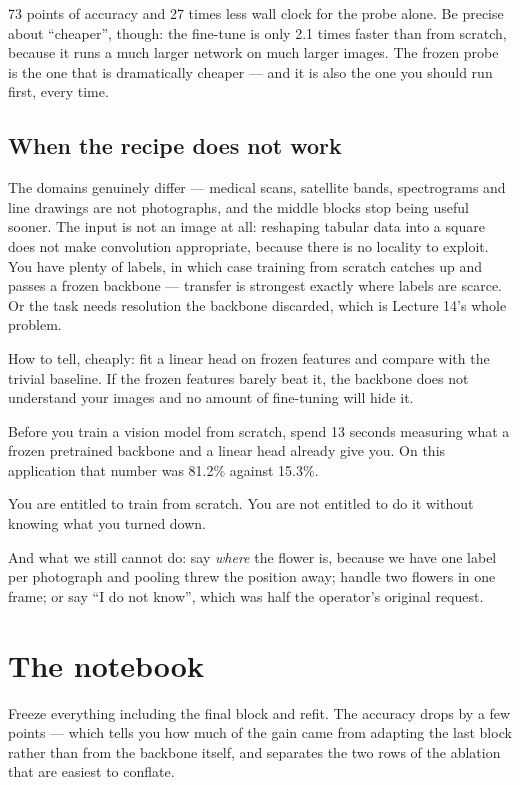 \documentclass[11pt,a4paper]{article}
\begin{document}
73 points of accuracy and 27 times less wall clock for the probe alone. Be
precise about ``cheaper'', though: the fine-tune is only 2.1 times faster than
from scratch, because it runs a much larger network on much larger images. The
frozen probe is the one that is dramatically cheaper --- and it is also the one
you should run first, every time.

\subsection{When the recipe does not work}

The domains genuinely differ --- medical scans, satellite bands, spectrograms
and line drawings are not photographs, and the middle blocks stop being useful
sooner. The input is not an image at all: reshaping tabular data into a square
does not make convolution appropriate, because there is no locality to exploit.
You have plenty of labels, in which case training from scratch catches up and
passes a frozen backbone --- transfer is strongest exactly where labels are
scarce. Or the task needs resolution the backbone discarded, which is Lecture
14's whole problem.

How to tell, cheaply: fit a linear head on frozen features and compare with the
trivial baseline. If the frozen features barely beat it, the backbone does not
understand your images and no amount of fine-tuning will hide it.

\begin{keybox}[title={One line to keep}]
Before you train a vision model from scratch, spend 13 seconds measuring what a
frozen pretrained backbone and a linear head already give you. On this
application that number was 81.2\% against 15.3\%.

You are entitled to train from scratch. You are not entitled to do it without
knowing what you turned down.
\end{keybox}

And what we still cannot do: say \emph{where} the flower is, because we have
one label per photograph and pooling threw the position away; handle two
flowers in one frame; or say ``I do not know'', which was half the operator's
original request.

\section{The notebook}

\begin{trybox}[title={What to change}]
Freeze everything including the final block and refit. The accuracy drops by a
few points --- which tells you how much of the gain came from adapting the last
block rather than from the backbone itself, and separates the two rows of the
ablation that are easiest to conflate.
\end{trybox}
\end{document}
